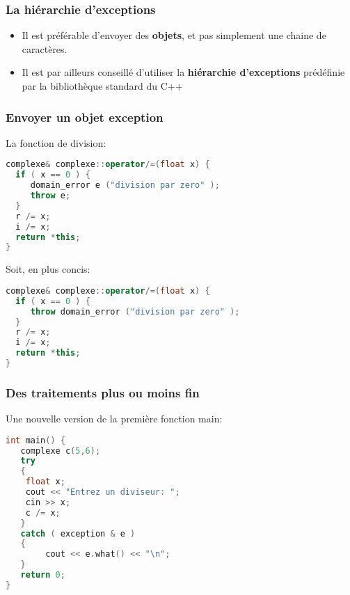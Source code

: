 \documentclass{beamer}
\begin{document}
\begin{frame}[fragile=singleslide,shrink=20]
\frametitle {La hiérarchie d'exceptions}

\begin{itemize}
\item{Il est préférable d'envoyer des \textbf{objets}, et pas simplement une chaine de caractères.}
\item{Il est par ailleurs conseillé d'utiliser la \textbf{hiérarchie d'exceptions} prédéfinie par la bibliothèque standard du C++}
\end{itemize}

\begin{centering}%
%
\par%
\end{centering}%
\end{frame}

\begin{frame}[fragile=singleslide,shrink=20]
\frametitle {Envoyer un objet exception}

La fonction de division:
\begin{lstlisting}[language=c++]
complexe& complexe::operator/=(float x) {
  if ( x == 0 ) {
     domain_error e ("division par zero" );
     throw e;
  }
  r /= x;
  i /= x;
  return *this;
}
\end{lstlisting}

Soit, en plus concis:
\begin{lstlisting}[language=c++]
complexe& complexe::operator/=(float x) {
  if ( x == 0 ) {
     throw domain_error ("division par zero" );
  }
  r /= x;
  i /= x;
  return *this;
}
\end{lstlisting}
\end{frame}

\begin{frame}[fragile=singleslide,shrink=20]
\frametitle {Des traitements plus ou moins fin}

Une nouvelle version de la première fonction main:
\begin{lstlisting}[language=c++]
int main() {
   complexe c(5,6);
   try
   {
   	float x;
   	cout << "Entrez un diviseur: ";
	cin >> x;
	c /= x;
   }
   catch ( exception & e ) 
   {
    	cout << e.what() << "\n";
   }
   return 0;
}
\end{lstlisting}
\end{frame}
\end{document}
